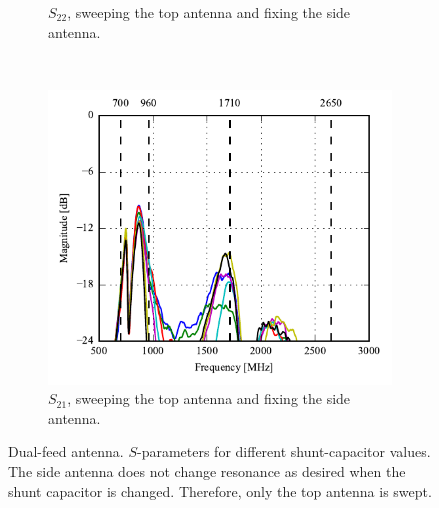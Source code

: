 \begin{figure}[htbp]
\begin{subfigure}{0.49\linewidth}
        \caption{$S_{22}$, sweeping the top antenna and fixing the side antenna.}
    \end{subfigure}
    \\
    \begin{subfigure}{0.49\linewidth}
        \centering
        \includegraphics{img/tech_sol/nonresonant/prototype/s21_csh1.pdf}
        \caption{$S_{21}$, sweeping the top antenna and fixing the side antenna.}
    \end{subfigure}
    \caption{Dual-feed antenna. $S$-parameters for different shunt-capacitor values. The side antenna does not change resonance as desired when the shunt capacitor is changed. Therefore, only the top antenna is swept.}
    \label{fig:nonresonant_proto_sweep_sparams}
\end{figure}

